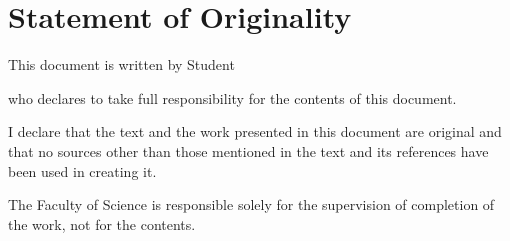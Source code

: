 \chapter*{Statement of Originality}
    This document is written by Student \author{} who declares to take full responsibility for the contents of this document.

	I declare that the text and the work presented in this document are original and that no sources other than those mentioned in the text and its references have been used in creating it.

	The Faculty of Science is responsible solely for the supervision of completion of the work, not for the contents.